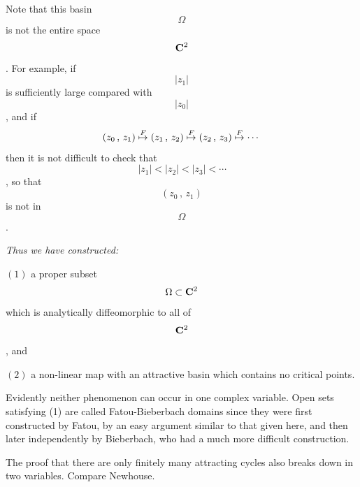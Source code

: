 
Note that this basin \[\Omega\] is not the entire space \[{\bf C}^2\]. For example, if \[
|z_1|\] is sufficiently large compared with \[|z_0|\], and if
$$	(z_0\,,\,z_1)\buildrel F\over\mapsto (z_1\,,\,z_2)\buildrel
	 F\over\mapsto (z_2\,,\,z_3)\buildrel F\over\mapsto\cdots	$$
then it is not difficult to check that \[\;|z_1|<|z_2|<|z_3|<\cdots\,\],
so that \[(z_0\,,\,z_1)\] is not in \[\Omega\].
{\it Thus we have constructed:\smallskip

$(1)$ a proper subset \[\Omega\subset{\bf C}^2\] which is analytically diffeomorphic to
all of \[{\bf C}^2\], and\smallskip

$(2)$ a non-linear map with an attractive basin which contains no critical
points.}\smallskip

\noindent Evidently neither phenomenon can occur in one complex variable.
Open sets satisfying (1) are called {\bit Fatou-Bieberbach domains} since they
were first constructed by Fatou, by an easy argument similar to that given
here, and then later independently by Bieberbach, who had a much more
difficult construction.\smallskip

The proof that there are only finitely many attracting cycles
also breaks down in two variables. Compare Newhouse.
\lln

